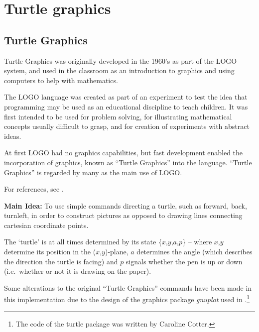 
\section{Turtle graphics}

\newcommand{\turtlesyntax}[1]{\textsl{SYNTAX: } \texttt{#1}}
\newcommand{\turtleabb}[1]{\textsl{Abbreviated form: } \texttt{#1}}
\ifdefined\HCode
\newcommand{\turtleincludegraphics}[1]
           {\texttt{[image: \#1.eps]}}
\else
\newcommand{\turtleincludegraphics}[1]
           {\texttt{[image: \#1.pdf]}}
\fi

\subsection{Turtle Graphics}

Turtle Graphics was originally developed in the 1960's as part of the
LOGO system, and used in the classroom as an introduction to graphics
and using computers to help with mathematics.

The LOGO language was created as part of an experiment to test the idea
that programming may be used as an educational discipline to teach children.
It was first intended to be used for problem solving, for illustrating
mathematical concepts usually difficult to grasp, and for creation of
experiments with abstract ideas.

At first LOGO had no graphics capabilities, but fast development enabled
the incorporation of graphics, known as ``Turtle Graphics'' into the
language. ``Turtle Graphics'' is regarded by many as the main use of
LOGO.

For references, see \cite{PutnikZoran:1997,LozanoMacias:1994}.

\textbf{Main Idea: } To use simple commands directing a turtle, such as
forward, back, turnleft, in order to construct pictures as opposed to
drawing lines connecting cartesian coordinate points.

The `turtle' is at all times determined by its state \{$x$,$y$,$a$,$p$\} --
where $x$,$y$ determine its position in the \mbox{($x$,$y$)-plane}, $a$
determines the angle (which describes the direction the turtle is
facing) and $p$ signals whether the pen is up or down (i.e.\ whether or
not it is drawing on the paper).


Some alterations to the original ``Turtle Graphics'' commands have been
made in this implementation due to the design of the graphics package
\emph{gnuplot} used in {\REDUCE}.\footnote{The code of the turtle package was written by Caroline Cotter.}

